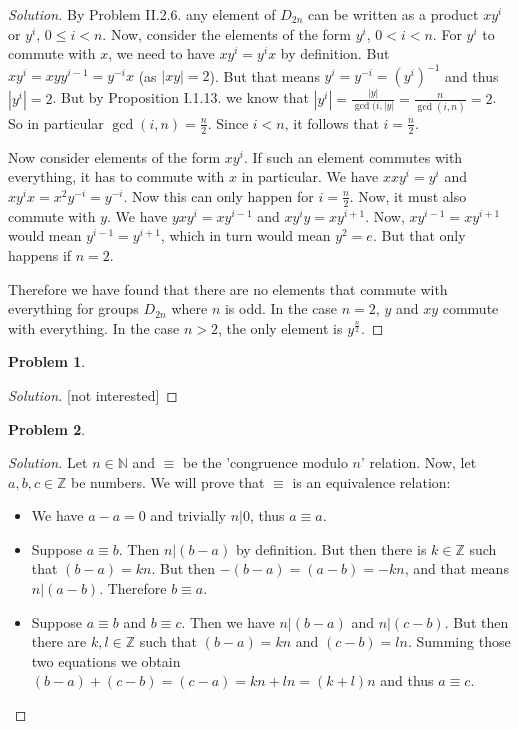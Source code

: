 \documentclass{article}
\theoremstyle{definition}
\newtheorem{problem-internal}{Problem}[subsection]
\newenvironment{problem}{
	\medskip
	\begin{problem-internal}
	}{
\end{problem-internal}
}
\newenvironment{solution}{
	\begin{proof}[Solution]
		\vspace{-8px}
		\setlength{\parskip}{4px}
		\setlength{\parindent}{0px}
	}{
\end{proof}
}
\newcommand{\abs}[1]{\left|#1\right|}
\begin{document}
\begin{solution}
	By Problem II.2.6. any element of $D_{2n}$ can be written as a product $xy^i$ or $y^i$, $0 \leq i < n$. Now, consider the elements of the form $y^i$, $0 < i < n$. For $y^i$ to commute with $x$, we need to have $x y^i=y^i x$ by definition. But $x y^i = x y y^{i-1} = y^{-i} x$ (as $\abs{xy}=2$). But that means $y^i = y^{-i}=(y^i)^{-1}$ and thus $\abs{y^i}=2$. But by Proposition I.1.13. we know that $\abs{y^i}=\frac{\abs{y}}{\gcd(i, \abs{y}}=\frac{n}{\gcd(i,n)}=2$. So in particular $\gcd(i,n)=\frac{n}{2}$. Since $i < n$, it follows that $i=\frac{n}{2}$.
		
	Now consider elements of the form $xy^i$. If such an element commutes with everything, it has to commute with $x$ in particular. We have $xxy^i=y^i$ and $xy^ix=x^2y^{-i}=y^{-i}$. Now this can only happen for $i = \frac{n}{2}$. Now, it must also commute with $y$. We have $yxy^i=xy^{i-1}$ and $xy^{i}y=xy^{i+1}$. Now, $xy^{i-1}=xy^{i+1}$ would mean $y^{i-1}=y^{i+1}$, which in turn would mean $y^2=e$. But that only happens if $n=2$.
	
	Therefore we have found that there are no elements that commute with everything for groups $D_{2n}$ where $n$ is odd. In the case $n=2$, $y$ and $xy$ commute with everything. In the case $n > 2$, the only element is $y^{\frac{n}{2}}$.
\end{solution}

\begin{problem}
\end{problem}

\begin{solution}
	[not interested]
\end{solution}

\begin{problem}
\end{problem}

\begin{solution}
	Let $n\in\mathbb{N}$ and $\equiv$ be the 'congruence modulo $n$' relation. Now, let $a,b,c \in \mathbb{Z}$ be numbers. We will prove that $\equiv$ is an equivalence relation:
	\begin{itemize}
		\item We have $a-a=0$ and trivially $n | 0$, thus $a \equiv a$.
		\item Suppose $a \equiv b$. Then $n | (b - a)$ by definition. But then there is $k \in \mathbb{Z}$ such that $(b - a) = kn$. But then $-(b - a) = (a - b) = -kn$, and that means $n | (a - b)$. Therefore $b \equiv a$.
		\item Suppose $a \equiv b$ and $b \equiv c$. Then we have $n | (b - a)$ and $n | (c - b)$. But then there are $k,l \in \mathbb{Z}$ such that $(b - a) = kn$ and $(c - b) = ln$. Summing those two equations we obtain $(b - a) + (c - b) = (c - a) = kn + ln = (k + l)n$ and thus $a \equiv c$.
	\end{itemize}
\end{solution}
\end{document}
